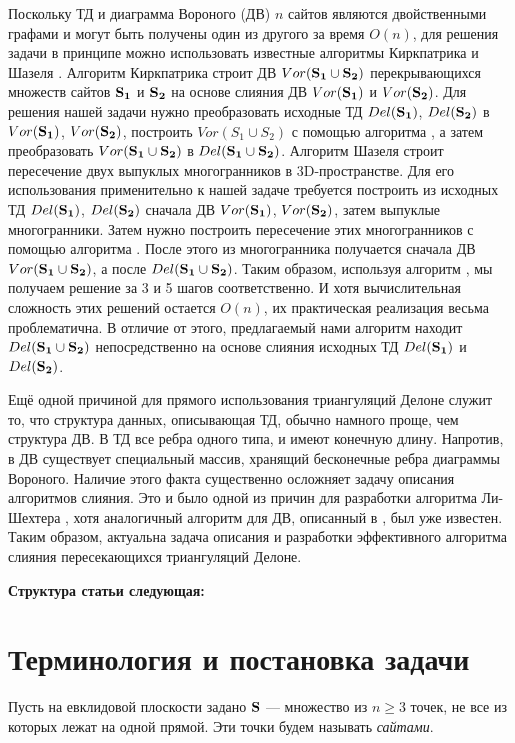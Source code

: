 \documentclass[12pt]{article}
\begin{document}
Поскольку ТД и диаграмма Вороного (ДВ) $n$ сайтов являются двойственными графами и могут быть получены один из другого за время $O(n)$, для решения задачи в принципе можно использовать известные алгоритмы Киркпатрика \cite{Kirkpatrick} и Шазеля \cite{Chazelle}.
Алгоритм Киркпатрика \cite{Kirkpatrick} строит ДВ $Vor(\bf{S_1} \cup \bf{S_2})$ перекрывающихся множеств сайтов $\bf{S_1}$ и $\bf{S_2}$ на основе слияния ДВ $Vor(\bf{S_1})$ и $Vor(\bf{S_2})$. Для решения нашей задачи нужно преобразовать исходные ТД $Del(\bf{S_1})$, $Del(\bf{S_2})$ в $Vor(\bf{S_1})$, $Vor(\bf{S_2})$, построить $Vor(S_1 \cup S_2)$ с помощью алгоритма \cite{Kirkpatrick}, а затем преобразовать $Vor(\bf{S_1} \cup \bf{S_2})$ в $Del(\bf{S_1} \cup \bf{S_2})$.
Алгоритм Шазеля \cite{Chazelle} строит пересечение двух выпуклых многогранников в 3D-пространстве.
Для его использования применительно к нашей задаче требуется построить из исходных ТД $Del(\bf{S_1})$, $Del(\bf{S_2})$ сначала ДВ $Vor(\bf{S_1})$, $Vor(\bf{S_2})$, затем выпуклые многогранники. Затем нужно построить пересечение этих многогранников с помощью алгоритма \cite{Chazelle}. После этого из многогранника получается сначала ДВ $Vor(\bf{S_1} \cup \bf{S_2})$, а после $Del(\bf{S_1} \cup \bf{S_2})$.
Таким образом, используя алгоритм \cite{Kirkpatrick, Chazelle}, мы получаем решение за 3 и 5 шагов соответственно. И хотя вычислительная сложность этих решений остается $O(n)$, их практическая реализация весьма проблематична.
В отличие от этого, предлагаемый нами алгоритм находит $Del(\bf{S_1} \cup \bf{S_2})$ непосредственно на основе слияния исходных ТД $Del(\bf{S_1})$ и $Del(\bf{S_2})$.

Ещё одной причиной для прямого использования триангуляций Делоне служит то, что структура данных, описывающая ТД, обычно намного проще, чем структура ДВ.
В ТД все ребра одного типа, и имеют конечную длину.
Напротив, в ДВ существует специальный массив, хранящий бесконечные ребра диаграммы Вороного.
Наличие этого факта существенно осложняет задачу описания алгоритмов слияния.
Это и было одной из причин для разработки алгоритма Ли-Шехтера \cite{Lee}, хотя аналогичный алгоритм для ДВ, описанный в \cite{Shamos}, был уже известен.
Таким образом, актуальна задача описания и разработки эффективного алгоритма слияния пересекающихся триангуляций Делоне.

{\bf \color{red} Структура статьи следующая:}

\section{Терминология и постановка задачи}
Пусть на евклидовой плоскости задано $\bf{S}$ --- множество из
$n \ge 3$ точек, не все из которых лежат на одной прямой.
Эти точки будем называть {\it сайтами}.
\end{document}
